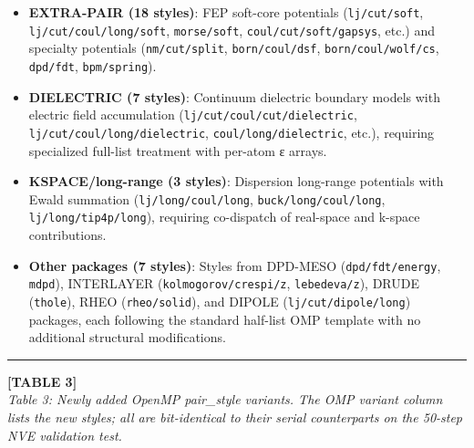 \documentclass[
  11pt,
]{article}
\providecommand{\tightlist}{%
  \setlength{\itemsep}{0pt}\setlength{\parskip}{0pt}}
\providecommand{\tightlist}{%
  \setlength{\itemsep}{0pt}\setlength{\parskip}{0pt}}
\begin{document}
\begin{itemize}
\tightlist
\item
  \textbf{EXTRA-PAIR (18 styles)}: FEP soft-core potentials
  (\texttt{lj/cut/soft}, \texttt{lj/cut/coul/long/soft},
  \texttt{morse/soft}, \texttt{coul/cut/soft/gapsys}, etc.) and
  specialty potentials (\texttt{nm/cut/split}, \texttt{born/coul/dsf},
  \texttt{born/coul/wolf/cs}, \texttt{dpd/fdt}, \texttt{bpm/spring}).
\item
  \textbf{DIELECTRIC (7 styles)}: Continuum dielectric boundary models
  with electric field accumulation (\texttt{lj/cut/coul/cut/dielectric},
  \texttt{lj/cut/coul/long/dielectric}, \texttt{coul/long/dielectric},
  etc.), requiring specialized full-list treatment with per-atom ε
  arrays.
\item
  \textbf{KSPACE/long-range (3 styles)}: Dispersion long-range
  potentials with Ewald summation (\texttt{lj/long/coul/long},
  \texttt{buck/long/coul/long}, \texttt{lj/long/tip4p/long}), requiring
  co-dispatch of real-space and k-space contributions.
\item
  \textbf{Other packages (7 styles)}: Styles from DPD-MESO
  (\texttt{dpd/fdt/energy}, \texttt{mdpd}), INTERLAYER
  (\texttt{kolmogorov/crespi/z}, \texttt{lebedeva/z}), DRUDE
  (\texttt{thole}), RHEO (\texttt{rheo/solid}), and DIPOLE
  (\texttt{lj/cut/dipole/long}) packages, each following the standard
  half-list OMP template with no additional structural modifications.
\end{itemize}

\begin{center}\rule{0.5\linewidth}{0.5pt}\end{center}

\textbf{{[}TABLE 3{]}}\\
\emph{Table 3: Newly added OpenMP pair\_style variants. The OMP variant
column lists the new styles; all are bit-identical to their serial
counterparts on the 50-step NVE validation test.}
\end{document}
